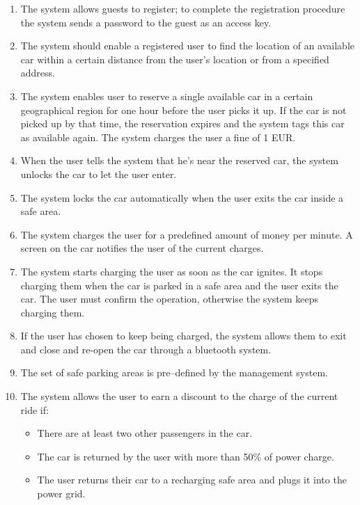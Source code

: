 			
			
			\begin{enumerate}
				\item The system allows guests to register; to complete the registration procedure the system sends a password to the guest as an access key.
				\item The system should enable a registered user to find the location of an available car within a certain distance from the user's location or from a specified address.
				\item The system enables user to reserve a single available car in a certain geographical region for one hour before the user picks it up. If the car is not picked up by that time, the reservation expires and the system tags this car as available again. The system charges the user a fine of 1 EUR.
				\item When the user tells the system that he's near the reserved car, the system unlocks the car to let the user enter.  
				\item The system locks the car automatically when the user exits the car inside a safe area.  
				\item The system charges the user for a predefined amount of money per minute. A screen on the car notifies the user of the current charges.
				\item The system starts charging the user as soon as the car ignites. It stops charging them when the car is parked in a safe area and the user exits the car. The user must confirm the operation, otherwise the system keeps charging them. 
				\item If the user has chosen to keep being charged, the system allows them to exit and close and re-open the car through a bluetooth system.
				\item The set of safe parking areas is pre–defined by the management system.
				\item The system allows the user to earn a discount to the charge of the current ride if:
					\begin{itemize}
						\item There are at least two other passengers in the car.
						\item The car is returned by the user with more than 50\% of power charge.
						\item The user returns their car to a recharging safe area and plugs it into the power grid.

\end{itemize}
\end{enumerate}
